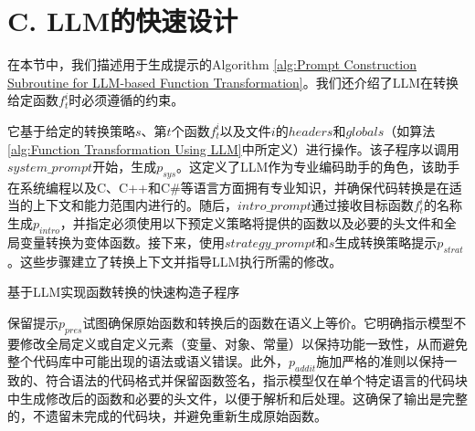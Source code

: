\section{C. LLM的快速设计}
在本节中，我们描述用于生成提示的Algorithm \ref{alg:Prompt Construction Subroutine for LLM-based Function Transformation}。我们还介绍了LLM在转换给定函数$f_{t}^{i}$时必须遵循的约束。

它基于给定的转换策略$s$、第$t$个函数$f_{t}^{i}$以及文件$i$的$headers$和$globals$（如算法\ref{alg:Function Transformation Using LLM}中所定义）进行操作。该子程序以调用$system\_prompt$开始，生成$p_{sys}$。这定义了LLM作为专业编码助手的角色，该助手在系统编程以及C、C++和C\#等语言方面拥有专业知识，并确保代码转换是在适当的上下文和能力范围内进行的。随后，$intro\_prompt$通过接收目标函数$f_{t}^{i}$的名称生成$p_{intro}$，并指定必须使用以下预定义策略将提供的函数以及必要的头文件和全局变量转换为变体函数。接下来，使用$strategy\_prompt$和$s$生成转换策略提示$p_{strat}$。这些步骤建立了转换上下文并指导LLM执行所需的修改。

\begin{algorithm}[htbp]
	\caption{基于LLM实现函数转换的快速构造子程序\label{alg:Prompt Construction Subroutine for LLM-based Function Transformation}}
\end{algorithm}

保留提示$p_{pres}$试图确保原始函数和转换后的函数在语义上等价。它明确指示模型不要修改全局定义或自定义元素（变量、对象、常量）以保持功能一致性，从而避免整个代码库中可能出现的语法或语义错误。此外，$p_{addit}$施加严格的准则以保持一致的、符合语法的代码格式并保留函数签名，指示模型仅在单个特定语言的代码块中生成修改后的函数和必要的头文件，以便于解析和后处理。这确保了输出是完整的，不遗留未完成的代码块，并避免重新生成原始函数。

